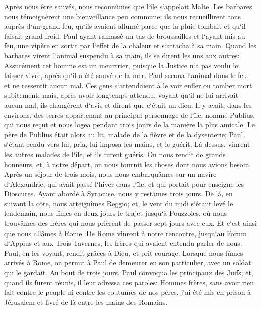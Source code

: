 \verse Après nous être sauvés, nous reconnûmes que l`île s`appelait Malte. 
\verse Les barbares nous témoignèrent une bienveillance peu commune; ils nous recueillirent tous auprès d`un grand feu, qu`ils avaient allumé parce que la pluie tombait et qu`il faisait grand froid. 
\verse Paul ayant ramassé un tas de broussailles et l`ayant mis au feu, une vipère en sortit par l`effet de la chaleur et s`attacha à sa main. 
\verse Quand les barbares virent l`animal suspendu à sa main, ils se dirent les uns aux autres: Assurément cet homme est un meurtrier, puisque la Justice n`a pas voulu le laisser vivre, après qu`il a été sauvé de la mer. 
\verse Paul secoua l`animal dans le feu, et ne ressentit aucun mal. 
\verse Ces gens s`attendaient à le voir enfler ou tomber mort subitement; mais, après avoir longtemps attendu, voyant qu`il ne lui arrivait aucun mal, ils changèrent d`avis et dirent que c`était un dieu. 
\verse Il y avait, dans les environs, des terres appartenant au principal personnage de l`île, nommé Publius, qui nous reçut et nous logea pendant trois jours de la manière la plus amicale. 
\verse Le père de Publius était alors au lit, malade de la fièvre et de la dysenterie; Paul, s`étant rendu vers lui, pria, lui imposa les mains, et le guérit. 
\verse Là-dessus, vinrent les autres malades de l`île, et ils furent guéris. 
\verse On nous rendit de grands honneurs, et, à notre départ, on nous fournit les choses dont nous avions besoin. 
\verse Après un séjour de trois mois, nous nous embarquâmes sur un navire d`Alexandrie, qui avait passé l`hiver dans l`île, et qui portait pour enseigne les Dioscures. 
\verse Ayant abordé à Syracuse, nous y restâmes trois jours. 
\verse De là, en suivant la côte, nous atteignîmes Reggio; et, le vent du midi s`étant levé le lendemain, nous fîmes en deux jours le trajet jusqu`à Pouzzoles, 
\verse où nous trouvâmes des frères qui nous prièrent de passer sept jours avec eux. Et c`est ainsi que nous allâmes à Rome. 
\verse De Rome vinrent à notre rencontre, jusqu`au Forum d`Appius et aux Trois Tavernes, les frères qui avaient entendu parler de nous. Paul, en les voyant, rendit grâces à Dieu, et prit courage. 
\verse Lorsque nous fûmes arrivés à Rome, on permit à Paul de demeurer en son particulier, avec un soldat qui le gardait. 
\verse Au bout de trois jours, Paul convoqua les principaux des Juifs; et, quand ils furent réunis, il leur adressa ces paroles: Hommes frères, sans avoir rien fait contre le peuple ni contre les coutumes de nos pères, j`ai été mis en prison à Jérusalem et livré de là entre les mains des Romains. 
